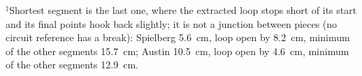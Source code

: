 $^\ddagger$Shortest segment is the last one, where the extracted loop stops short of its start and its final points hook back slightly; it is not a junction between pieces (no circuit reference has a break): Spielberg 5.6~cm, loop open by 8.2~cm, minimum of the other segments 15.7~cm; Austin 10.5~cm, loop open by 4.6~cm, minimum of the other segments 12.9~cm.
